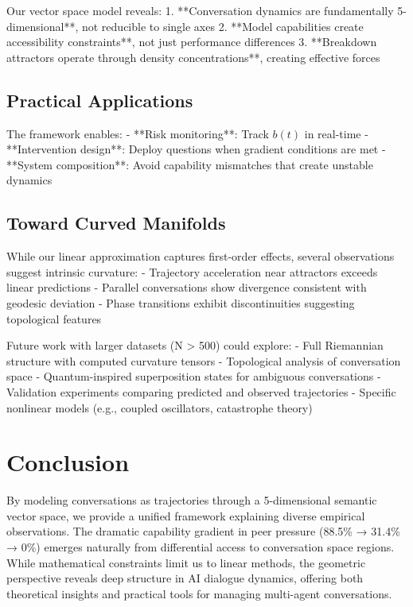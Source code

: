 \documentclass[11pt,letterpaper]{article}
\begin{document}
Our vector space model reveals:
1. **Conversation dynamics are fundamentally 5-dimensional**, not reducible to single axes
2. **Model capabilities create accessibility constraints**, not just performance differences
3. **Breakdown attractors operate through density concentrations**, creating effective forces

\subsection{Practical Applications}

The framework enables:
- **Risk monitoring**: Track $b(t)$ in real-time
- **Intervention design**: Deploy questions when gradient conditions are met
- **System composition**: Avoid capability mismatches that create unstable dynamics

\subsection{Toward Curved Manifolds}

While our linear approximation captures first-order effects, several observations suggest intrinsic curvature:
- Trajectory acceleration near attractors exceeds linear predictions
- Parallel conversations show divergence consistent with geodesic deviation
- Phase transitions exhibit discontinuities suggesting topological features

Future work with larger datasets (N > 500) could explore:
- Full Riemannian structure with computed curvature tensors
- Topological analysis of conversation space
- Quantum-inspired superposition states for ambiguous conversations
- Validation experiments comparing predicted and observed trajectories
- Specific nonlinear models (e.g., coupled oscillators, catastrophe theory)

\section{Conclusion}

By modeling conversations as trajectories through a 5-dimensional semantic vector space, we provide a unified framework explaining diverse empirical observations. The dramatic capability gradient in peer pressure (88.5\% → 31.4\% → 0\%) emerges naturally from differential access to conversation space regions. While mathematical constraints limit us to linear methods, the geometric perspective reveals deep structure in AI dialogue dynamics, offering both theoretical insights and practical tools for managing multi-agent conversations.



\end{document}
